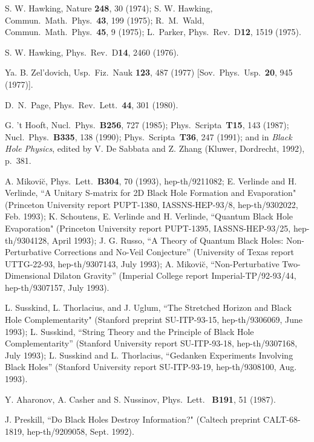 \newpage
	\begin{thebibliography}{99}
\baselineskip 15.1pt
\parskip 0pt
 S. W. Hawking, Nature {\bf 248}, 30 (1974);
S. W. Hawking, Commun.\ Math.\ Phys.\ {\bf 43}, 199 (1975);
R.\ M.\ Wald, Commun.\ Math.\ Phys.\ {\bf 45}, 9 (1975);
L.\ Parker, Phys.\ Rev.\ D{\bf12}, 1519 (1975).

 S. W. Hawking,  Phys.\ Rev.\ D{\bf14}, 2460 (1976).

 Ya. B. Zel'dovich, Usp.\ Fiz.\ Nauk {\bf 123}, 487
(1977)
[Sov.\ Phys.\ Usp.\ {\bf 20}, 945 (1977)].

 D.\ N.\ Page, Phys.\ Rev.\ Lett.\ {\bf 44}, 301
(1980).

 G. 't Hooft, Nucl.\ Phys.\ {\bf B256}, 727 (1985);
Phys.\ Scripta\ {\bf T15}, 143 (1987);
Nucl.\ Phys.\ {\bf B335}, 138 (1990);
Phys.\ Scripta\ {\bf T36}, 247 (1991);
and in {\em Black Hole Physics}, edited by V. De
Sabbata and Z. Zhang (Kluwer, Dordrecht, 1992), p.~381.

 A. Mikovi\u{c}, Phys.\ Lett.\ {\bf B304}, 70
(1993),
hep-th/9211082;
E. Verlinde and H. Verlinde, ``A Unitary S-matrix for 2D Black
Hole Formation and Evaporation" (Princeton University report
PUPT-1380,
IASSNS-HEP-93/8, hep-th/9302022, Feb. 1993);
K. Schoutens, E. Verlinde and H. Verlinde, ``Quantum Black Hole
Evaporation" (Princeton University report PUPT-1395,
IASSNS-HEP-93/25,
hep-th/9304128, April 1993);
J. G. Russo, ``A Theory of Quantum Black Holes:
Non-Perturbative Corrections and No-Veil Conjecture''
(University of Texas report UTTG-22-93, hep-th/9307143, July 1993);
A. Mikovi\u{c}, ``Non-Perturbative Two-Dimensional Dilaton
Gravity'' (Imperial College report Imperial-TP/92-93/44,
hep-th/9307157, July 1993).

 L. Susskind, L. Thorlacius, and J. Uglum, ``The
Stretched
Horizon and Black Hole Complementarity" (Stanford preprint
SU-ITP-93-15, hep-th/9306069, June 1993);
L. Susskind, ``String Theory and the Principle of Black Hole
Complementarity'' (Stanford University report SU-ITP-93-18,
hep-th/9307168, July 1993);
L. Susskind and L. Thorlacius, ``Gedanken Experiments
Involving Black Holes'' (Stanford University report SU-ITP-93-19,
hep-th/9308100, Aug. 1993).

 Y. Aharonov, A. Casher and S. Nussinov,  Phys.\ Lett.\
{\bf
B191}, 51 (1987).

 J. Preskill, ``Do Black Holes Destroy Information?"
(Caltech
preprint CALT-68-1819, hep-th/9209058, Sept. 1992).


\end{thebibliography}
